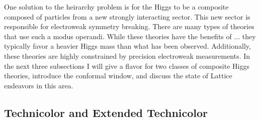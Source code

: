 
One solution to the heirarchy problem is for the Higgs to be a composite composed of particles from a new strongly interacting sector.
This new sector is responsible for electroweak symmetry breaking.
There are many types of theories that use such a modus operandi.
While these theories have the benefits of ... they typically favor a heavier Higgs mass than what has been observed.
Additionally, these theories are highly constrained by precision electroweak measurements.
In the next three subsections I will give a flavor for two classes of composite Higgs theories, introduce the conformal window, and discuss the state of Lattice endeavors in this area.

\subsection{Technicolor and Extended Technicolor}


